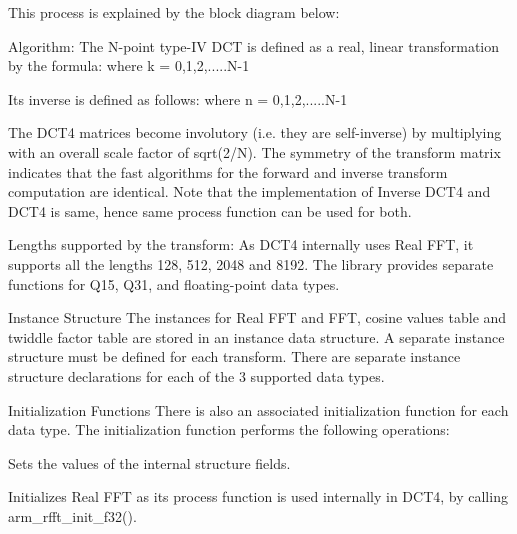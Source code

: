 This process is explained by the block diagram below\+:  \begin{DoxyParagraph}{Algorithm\+:}
The N-\/point type-\/\+IV D\+CT is defined as a real, linear transformation by the formula\+:  where {\ttfamily k = 0,1,2,.....N-\/1} 
\end{DoxyParagraph}
\begin{DoxyParagraph}{}
Its inverse is defined as follows\+:  where {\ttfamily n = 0,1,2,.....N-\/1} 
\end{DoxyParagraph}
\begin{DoxyParagraph}{}
The D\+C\+T4 matrices become involutory (i.\+e. they are self-\/inverse) by multiplying with an overall scale factor of sqrt(2/N). The symmetry of the transform matrix indicates that the fast algorithms for the forward and inverse transform computation are identical. Note that the implementation of Inverse D\+C\+T4 and D\+C\+T4 is same, hence same process function can be used for both.
\end{DoxyParagraph}
\begin{DoxyParagraph}{Lengths supported by the transform\+:}
As D\+C\+T4 internally uses Real F\+FT, it supports all the lengths 128, 512, 2048 and 8192. The library provides separate functions for Q15, Q31, and floating-\/point data types. 
\end{DoxyParagraph}
\begin{DoxyParagraph}{Instance Structure}
The instances for Real F\+FT and F\+FT, cosine values table and twiddle factor table are stored in an instance data structure. A separate instance structure must be defined for each transform. There are separate instance structure declarations for each of the 3 supported data types.
\end{DoxyParagraph}
\begin{DoxyParagraph}{Initialization Functions}
There is also an associated initialization function for each data type. The initialization function performs the following operations\+:
\begin{DoxyItemize}
\item Sets the values of the internal structure fields.
\item Initializes Real F\+FT as its process function is used internally in D\+C\+T4, by calling arm\+\_\+rfft\+\_\+init\+\_\+f32(). 
\end{DoxyItemize}
\end{DoxyParagraph}
